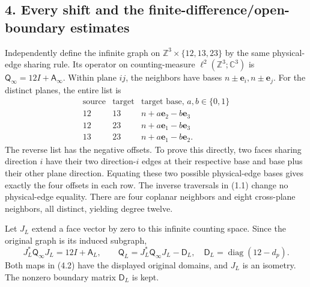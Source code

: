 \documentclass[
  11pt,
]{article}
\begin{document}
\subsection{4. Every shift and the finite-difference/open-boundary
estimates}\label{magnetic-part-8-every-shift-and-the-finite-differenceopen-boundary-estimates}

Independently define the infinite graph on
\(\mathbb Z^3\times\{12,13,23\}\) by the same physical-edge sharing
rule. Its operator on counting-measure
\(\ell^2(\mathbb Z^3;\mathbb C^3)\) is
\(\mathsf Q_\infty=12I+\mathsf A_\infty\). Within plane \(ij\), the
neighbors have bases \(n\pm\mathbf e_i,n\pm\mathbf e_j\). For the
distinct planes, the entire list is \[
\begin{array}{c|c|c}
\text{source}&\text{target}&\text{target base, }a,b\in\{0,1\}\\ \hline
12&13&n+a\mathbf e_2-b\mathbf e_3\\
12&23&n+a\mathbf e_1-b\mathbf e_3\\
13&23&n+a\mathbf e_1-b\mathbf e_2.
\end{array}
\tag{4.1}
\] The reverse list has the negative offsets. To prove this directly,
two faces sharing direction \(i\) have their two direction-\(i\) edges
at their respective base and base plus their other plane direction.
Equating these two possible physical-edge bases gives exactly the four
offsets in each row. The inverse traversals in (1.1) change no
physical-edge equality. There are four coplanar neighbors and eight
cross-plane neighbors, all distinct, yielding degree twelve.

Let \(J_L\) extend a face vector by zero to this infinite counting
space. Since the original graph is its induced subgraph, \[
J_L^*\mathsf Q_\infty J_L=12I+\mathsf A_L,
\qquad
\boxed{\mathsf Q_L=J_L^*\mathsf Q_\infty J_L-\mathsf D_L},
\quad \mathsf D_L=\operatorname{diag}(12-d_p).
\tag{4.2}
\] Both maps in (4.2) have the displayed original domains, and \(J_L\)
is an isometry. The nonzero boundary matrix \(\mathsf D_L\) is kept.
\end{document}
